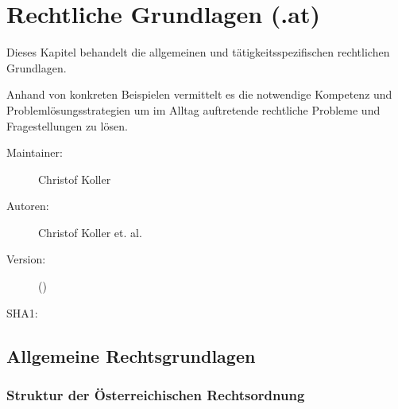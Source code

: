 \def\ChapterCode{JUS}
\chapter
[\CO{[JUS]} Rechtliche Grundlagen (.at)]
{Rechtliche Grundlagen (.at)}
\label{chp:JUS}

\setcounter{tocdepth}{10}
\ChapterIntro
{%
Dieses Kapitel behandelt die allgemeinen und
tätigkeitsspezifischen rechtlichen Grundlagen. 

Anhand von konkreten Beispielen vermittelt es die notwendige
Kompetenz und Problemlösungsstrategien um im Alltag
auftretende rechtliche Probleme und Fragestellungen zu
lösen.
}
{%
\begin{description}
  \item[Maintainer:] Christof Koller
  \item[Autoren:] Christof Koller et. al.
  \item[Version:] {\VarDocVersionTypeName} ({\VarDocVersionTypeDescription})
  \item[SHA1:] {\DocGitCommit}
\end{description}

{\TxTeilkapitelAASS}
}
{}
% 
% 





\clearpage
\section{Allgemeine Rechtsgrundlagen}



\subsection{Struktur der Österreichischen Rechtsordnung}




